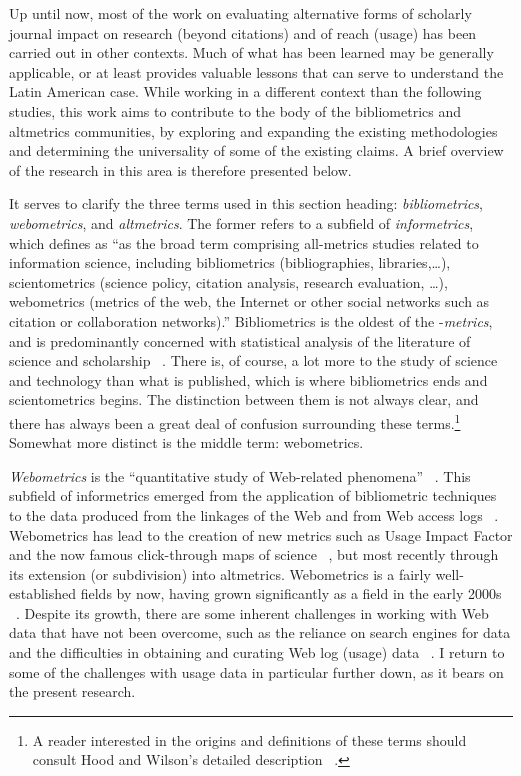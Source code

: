 Up until now, most of the work on evaluating alternative forms of scholarly journal impact on research (beyond citations) and of reach (usage) has been carried out in other contexts. Much of what has been learned may be generally applicable, or at least provides valuable lessons that can serve to understand the Latin American case. While working in a different context than the following studies, this work aims to contribute to the body of the bibliometrics and altmetrics communities, by exploring and expanding the existing methodologies and determining the universality of some of the existing claims. A brief overview of the research in this area is therefore presented below.

It serves to clarify the three terms used in this section heading: \emph{bibliometrics}, \emph{webometrics}, and \emph{altmetrics}. The former refers to a subfield of \emph{informetrics}, which  \citet[p. 1311]{Egghe2005} defines as ``as the broad term comprising all-metrics studies related to information science, including bibliometrics (bibliographies, libraries,…), scientometrics (science policy, citation analysis, research evaluation, …), webometrics (metrics of the web, the Internet or other social networks such as citation or collaboration networks).'' Bibliometrics is the oldest of the -\emph{metrics}, and is predominantly concerned with statistical analysis of the literature of science and scholarship ~\citep{Hood2001}. There is, of course, a lot more to the study of science and technology than what is published, which is where bibliometrics ends and scientometrics begins. The distinction between them is not always clear, and there has always been a great deal of confusion surrounding these terms.\footnote{A reader interested in the origins and definitions of these terms should consult Hood and Wilson's detailed description ~\citep{Hood2001}.} Somewhat more distinct is the middle term: webometrics.

\emph{Webometrics} is the ``quantitative study of Web-related phenomena'' ~\citep[p. 81]{Thelwall2006}. This subfield of informetrics emerged from the application of bibliometric techniques to the data produced from the linkages of the Web and from Web access logs ~\citep{Thelwall2006}. Webometrics has lead to the creation of new metrics such as Usage Impact Factor and the now famous click-through maps of science ~\citep{Bollen2009a}, but most recently through its extension (or subdivision) into altmetrics. Webometrics is a fairly well-established fields by now, having grown significantly as a field in the early 2000s ~\citep{Bar-Ilan2008b}. Despite its growth, there are some inherent challenges in working with Web data that have not been overcome, such as the reliance on search engines for data and the difficulties in obtaining and curating Web log (usage) data ~\citep{Priem2010d}. I return to some of the challenges with usage data in particular further down, as it bears on the present research.

